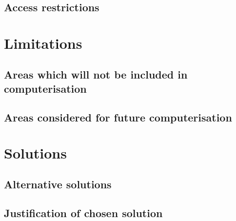 \documentclass[a4paper,12pt]{report}
\begin{document}
\subsection{Access restrictions}

\section{Limitations}

\subsection{Areas which will not be included in computerisation}

\subsection{Areas considered for future computerisation}

\section{Solutions}

\subsection{Alternative solutions}

\subsection{Justification of chosen solution}
\end{document}
